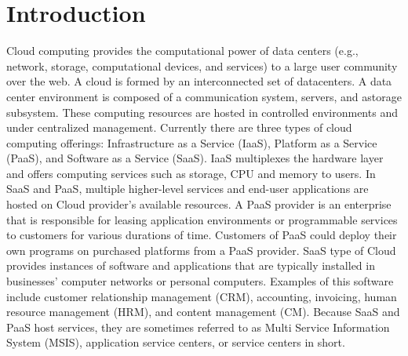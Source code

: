 \documentclass[11pt]{article}
\begin{document}
 \section{Introduction}   
 Cloud computing provides the computational power of data centers (e.g., network, storage, computational devices, and services) to a large user community over the web. 
	 A cloud is formed by an interconnected set of datacenters. 
	 A data center environment is composed of a communication system, servers, and astorage subsystem. 
	 These computing resources are hosted in controlled environments and under centralized management. 
		Currently there are three types of cloud computing offerings: Infrastructure as a Service (IaaS), Platform as a Service (PaaS), and Software as a Service (SaaS). 
		IaaS multiplexes the hardware layer and offers computing services such as storage, CPU and memory to users. 
		In SaaS and PaaS, multiple higher-level services and end-user applications are hosted on Cloud provider's available resources. 
		A PaaS provider is an enterprise that is responsible for leasing application environments or programmable services to customers for various durations of time. 
		Customers of PaaS could deploy their own programs on purchased platforms from a PaaS provider. 
		SaaS type of Cloud provides instances of software and applications that are typically installed in businesses' computer networks or personal computers. 
		Examples of this software include customer relationship management (CRM), accounting, invoicing, human resource management (HRM), and content management (CM). 
		Because SaaS and PaaS host services, they are sometimes referred to as Multi Service Information System (MSIS)\cite{li2011fast}, application service centers, or service centers in short.  
		
\end{document}
